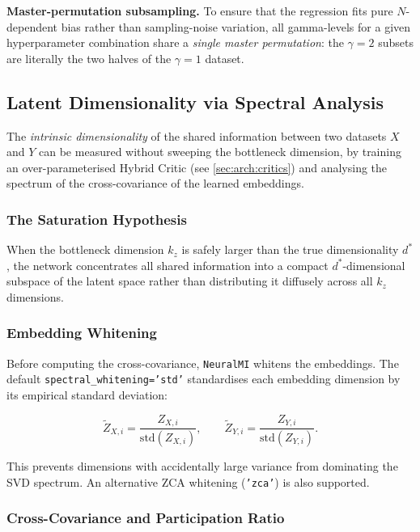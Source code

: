 \documentclass[12pt]{article}
\newcommand{\nmi}{\texttt{NeuralMI}}
\newcommand{\api}[1]{\texttt{#1}}
\begin{document}
\textbf{Master-permutation subsampling.}  To ensure that the regression fits
pure $N$-dependent bias rather than sampling-noise variation, all gamma-levels
for a given hyperparameter combination share a \emph{single master
permutation}: the $\gamma=2$ subsets are literally the two halves of the
$\gamma=1$ dataset.

\subsection{Latent Dimensionality via Spectral Analysis}
\label{sec:theory:dim}

The \emph{intrinsic dimensionality} of the shared information between two
datasets $X$ and $Y$ can be measured without sweeping the bottleneck dimension,
by training an over-parameterised Hybrid Critic (see \cref{sec:arch:critics})
and analysing the spectrum of the cross-covariance of the learned embeddings.

\subsubsection{The Saturation Hypothesis}

When the bottleneck dimension $k_z$ is safely larger than the true
dimensionality $d^*$, the network concentrates all shared information into
a compact $d^*$-dimensional subspace of the latent space rather than
distributing it diffusely across all $k_z$ dimensions.

\subsubsection{Embedding Whitening}

Before computing the cross-covariance, \nmi{} whitens the embeddings.  The
default \api{spectral\_whitening='std'} standardises each embedding
dimension by its empirical standard deviation:

\begin{equation}
  \tilde{Z}_{X,i} = \frac{Z_{X,i}}{\mathrm{std}(Z_{X,i})},
  \qquad
  \tilde{Z}_{Y,i} = \frac{Z_{Y,i}}{\mathrm{std}(Z_{Y,i})}.
  \label{eq:whitening}
\end{equation}

This prevents dimensions with accidentally large variance from dominating
the SVD spectrum.  An alternative ZCA whitening (\api{'zca'}) is also
supported.

\subsubsection{Cross-Covariance and Participation Ratio}
\end{document}
